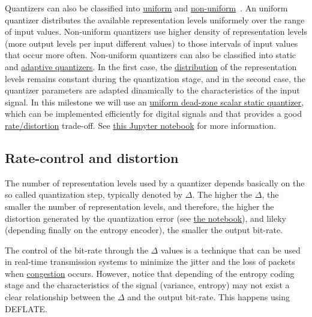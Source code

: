 Quantizers can also be classified into
\href{https://en.wikipedia.org/wiki/Quantization_(signal_processing)#Mid-riser_and_mid-tread_uniform_quantizers}{uniform}
and
\href{https://nptel.ac.in/content/storage2/courses/117104069/chapter_5/5_5.html}{non-uniform}~\cite{sayood2017introduction,vetterli2014foundations}. An
uniform quantizer distributes the available representation levels
uniformely over the range of input values. Non-uniform quantizers use
higher density of representation levels (more output levels per input
different values) to those intervals of input values that occur more
often. Non-uniform quantizers can also be classified into static and
\href{https://en.wikipedia.org/wiki/Adaptive_differential_pulse-code_modulation}{adaptive
  quantizers}. In the first case, the
\href{https://en.wikipedia.org/wiki/Probability_distribution}{distribution}
of the representation levels remains constant during the quantization
stage, and in the second case, the quantizer parameters are adapted
dinamically to the characteristics of the input signal. In this
milestone we will use an
\href{https://en.wikipedia.org/wiki/Quantization_(signal_processing)#Dead-zone_quantizers}{uniform
  dead-zone scalar static quantizer}, which can be implemented
efficiently for digital signals and that provides a good
\href{https://en.wikipedia.org/wiki/Rate%E2%80%93distortion_theory}{rate/distortion}
  trade-off. See
  \href{https://github.com/vicente-gonzalez-ruiz/quantization/blob/master/digital_quantization.ipynb}{this
    Jupyter notebook} for more information.

\subsection{Rate-control and distortion}
The number of representation levels used by a quantizer depends
basically on the so called quantization step, typically denoted by
$\Delta$. The higher the $\Delta$, the smaller the number of
representation levels, and therefore, the higher the distortion
generated by the quantization error (see
\href{https://github.com/vicente-gonzalez-ruiz/quantization/blob/master/digital_quantization.ipynb}{the
  notebook}), and lileky (depending finally on the entropy encoder),
the smaller the output bit-rate.

The control of the bit-rate through the $\Delta$ values is a technique
that can be used in real-time transmission systems to minimize the
jitter and the loss of packets when
\href{https://en.wikipedia.org/wiki/Network_congestion}{congestion}
occurs. However, notice that depending of the entropy coding stage and
the characteristics of the signal (variance, entropy) may not exist a
clear relationship between the $\Delta$ and the output bit-rate. This
happens using DEFLATE.

